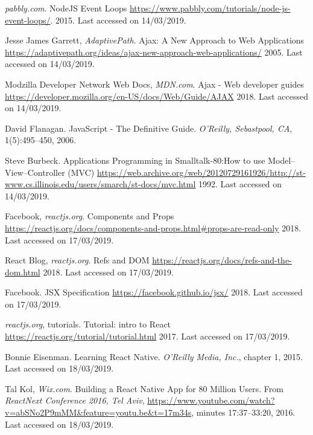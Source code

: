 \begin{thebibliography}{1}
\bibitem{[JS3]} {\textlatin{
{{\em pabbly.com}}.
NodeJS Event Loops
\url{https://www.pabbly.com/tutorials/node-js-event-loops/}}. 2015. Last accessed on 14/03/2019}. 

\bibitem{[AJAX1]} {\textlatin{
{Jesse James Garrett, {\em AdaptivePath}}.
Ajax: A New Approach to Web Applications
\url{https://adaptivepath.org/ideas/ajax-new-approach-web-applications/}
  2005. Last accessed on 14/03/2019}}.

\bibitem{[AJAX2]} {\textlatin{
{Modzilla Developer Network Web Docs, {\em MDN.com}}.
 Ajax - Web developer guides
\url{https://developer.mozilla.org/en-US/docs/Web/Guide/AJAX}
  2018. Last accessed on 14/03/2019}}.  

\bibitem{[SPA1]} {\textlatin{
David Flanagan. 
JavaScript - The Definitive Guide.
{\em O'Reilly, Sebastpool, CA}, 1(5):495--450, 2006}}.

\bibitem{[MVC1]} {\textlatin{
{Steve Burbeck}.
 Applications Programming in Smalltalk-80:How to use Model–View–Controller (MVC)
\url{https://web.archive.org/web/20120729161926/http://st-www.cs.illinois.edu/users/smarch/st-docs/mvc.html}
  1992. Last accessed on 14/03/2019}}.  

\bibitem{[REACT1]} {\textlatin{
{Facebook, {\em reactjs.org}}.
 Components and Props
\url{https://reactjs.org/docs/components-and-props.html#props-are-read-only}
  2018. Last accessed on 17/03/2019}}.  
  
\bibitem{[REACT2]} {\textlatin{
{React Blog, {\em reactjs.org}}.
 Refs and DOM
\url{https://reactjs.org/docs/refs-and-the-dom.html}
  2018. Last accessed on 17/03/2019}}.  
  
\bibitem{[REACT3]} {\textlatin{
{Facebook}.
 JSX Specification
\url{https://facebook.github.io/jsx/}
  2018. Last accessed on 17/03/2019}}. 
  
\bibitem{[REACT4]} {\textlatin{
{{\em reactjs.org}, tutorials}.
 Tutorial: intro to React
\url{https://reactjs.org/tutorial/tutorial.html}
  2017. Last accessed on 17/03/2019}}. 
  
\bibitem{[RN1]} {\textlatin{
Bonnie Eisenman. 
Learning React Native.
{\em O'Reilly Media, Inc.}, chapter 1, 2015. Last accessed on 18/03/2019}}. 

\bibitem{[RN2]} {\textlatin{
Tal Kol, {\em Wix.com}. 
Building a React Native App for 80 Million Users.
From {\em ReactNext Conference 2016, Tel Aviv},
\url{https://www.youtube.com/watch?v=abSNo2P9mMM&feature=youtu.be&t=17m34s},
minutes 17:37--33:20, 2016. Last accessed on 18/03/2019}}.


\end{thebibliography}
